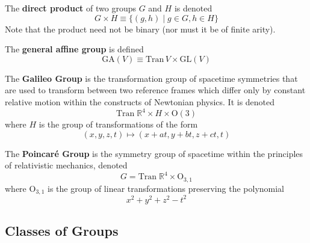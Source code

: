   \begin{definition}
    The \textbf{direct product} of two groups $G$ and $H$ is denoted
    \begin{equation}
      G \times H \equiv \{ (g, h)\;|\; g \in G, h \in H \}
    \end{equation}
    Note that the product need not be binary (nor must it be of finite arity). 
  \end{definition}

  \begin{definition}
    The \textbf{general affine group} is defined 
    \begin{equation}
      \text{GA}(V) \equiv \text{Tran}\,V \times \text{GL}(V)
    \end{equation}
  \end{definition}

  \begin{definition}
    The \textbf{Galileo Group} is the transformation group of spacetime symmetries that are used to transform between two reference frames which differ only by constant relative motion within the constructs of Newtonian physics. It is denoted 
    \begin{equation}
      \text{Tran}\;\mathbb{R}^{4} \times H \times \text{O} (3)
    \end{equation}
    where $H$ is the group of transformations of the form 
    \begin{equation}
      (x, y, z, t) \longmapsto (x+at, y+bt, z+ct, t)
    \end{equation}
  \end{definition}

  \begin{definition}
    The \textbf{Poincaré Group} is the symmetry group of spacetime within the principles of relativistic mechanics, denoted
    \begin{equation}
      G = \text{Tran}\; \mathbb{R}^{4} \times \text{O}_{3,1}
    \end{equation}
    where O$_{3,1}$ is the group of linear transformations preserving the polynomial 
    \begin{equation}
      x^{2} + y^{2} + z^{2} - t^{2}
    \end{equation}
  \end{definition}

\subsection{Classes of Groups}

